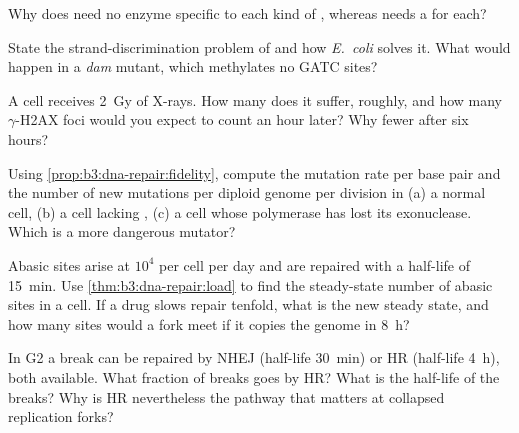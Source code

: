 \begin{exercise}[$\star$]\label{exo:b3:dna-repair:2}
Why does  need no enzyme specific to each
kind of , whereas  needs a  for
each?
\end{exercise}

\begin{exercise}[$\star$]\label{exo:b3:dna-repair:3}
State the strand-discrimination problem of  and how
\emph{E.~coli} solves it. What would happen in a \emph{dam} mutant,
which methylates no GATC sites?
\end{exercise}

\begin{exercise}[$\star$]\label{exo:b3:dna-repair:4}
A cell receives \qty{2}{Gy} of X-rays. How many 
does it suffer, roughly, and how many $\gamma$-H2AX foci would you
expect to count an hour later? Why fewer after six hours?
\end{exercise}

\begin{exercise}[$\star\star$]\label{exo:b3:dna-repair:5}
Using \cref{prop:b3:dna-repair:fidelity}, compute the mutation rate
per base pair and the number of new mutations per diploid genome per
division in (a) a normal cell, (b) a cell lacking ,
(c) a cell whose polymerase has lost its exonuclease. Which is a more
dangerous mutator?
\end{exercise}

\begin{exercise}[$\star\star$]\label{exo:b3:dna-repair:6}
Abasic sites arise at $10^{4}$ per cell per day and are repaired with
a half-life of \qty{15}{min}. Use \cref{thm:b3:dna-repair:load} to find
the steady-state number of abasic sites in a cell. If a drug slows
repair tenfold, what is the new steady state, and how many sites would
a fork meet if it copies the genome in \qty{8}{h}?
\end{exercise}

\begin{exercise}[$\star\star$]\label{exo:b3:dna-repair:7}
In G2 a break can be repaired by NHEJ (half-life \qty{30}{min}) or HR
(half-life \qty{4}{h}), both available. What fraction of breaks goes
by HR? What is the half-life of the breaks? Why is HR nevertheless
the pathway that matters at collapsed replication forks?
\end{exercise}

